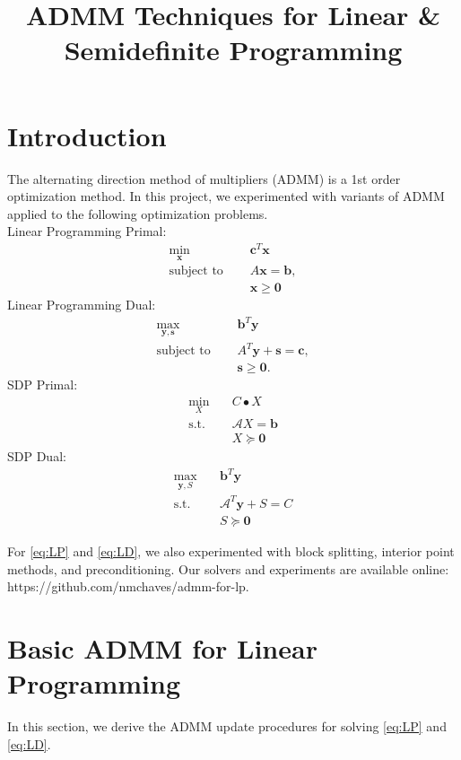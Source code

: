\documentclass{article}
\title{ADMM Techniques for Linear \& Semidefinite Programming }
\author{\studentname}
\begin{document}
\maketitle

\section{Introduction}
The alternating direction method of multipliers (ADMM) is a 1st order optimization method. In this project, we experimented with variants of ADMM applied to the following optimization problems. \\
Linear Programming Primal:
\begin{align}
\min_{\mathbf{x}} &\quad \mathbf{c}^T\mathbf{x} \tag{LP}\label{eq:LP} \\
\text{subject to } &\quad  A \mathbf{x} = \mathbf{b},  \nonumber \\
&\quad \mathbf{x} \geq \mathbf{0} \nonumber 
\end{align}
Linear Programming Dual:
\begin{align}
\max_{\mathbf{y}, \mathbf{s}} &\quad \mathbf{b}^T\mathbf{y}  \tag{LD}\label{eq:LD} \\
\text{subject to } &\quad  A^T \mathbf{y}  + \mathbf{s} = \mathbf{c},  \nonumber \\
&\quad \mathbf{s} \geq \mathbf{0} \nonumber.
\end{align}
SDP Primal:
\begin{align}
\min_{X} &\quad C\bullet X  \tag{SDP}\label{eq:SDP} \\
\text{s.t.} &\quad \mathcal{A}X=\mathbf{b} \nonumber \\
&\quad X\succeq \mathbf{0} \nonumber
\end{align}
SDP Dual:
\begin{align}
\max_{\mathbf{y},S} &\quad \mathbf{b}^{T}\mathbf{y} \tag{SDD}\label{eq:SDD}  \\
\text{s.t.} &\quad \mathcal{A}^{T}\mathbf{y}+S=C \nonumber \\
&\quad S\succeq\mathbf{0} \nonumber
\end{align}

For \eqref{eq:LP} and \eqref{eq:LD}, we also experimented with block splitting, interior point methods, and preconditioning. Our solvers and experiments are available online: https://github.com/nmchaves/admm-for-lp. 

\section{Basic ADMM for Linear Programming}
In this section, we derive the ADMM update procedures for solving \eqref{eq:LP} and \eqref{eq:LD}.
\end{document}
